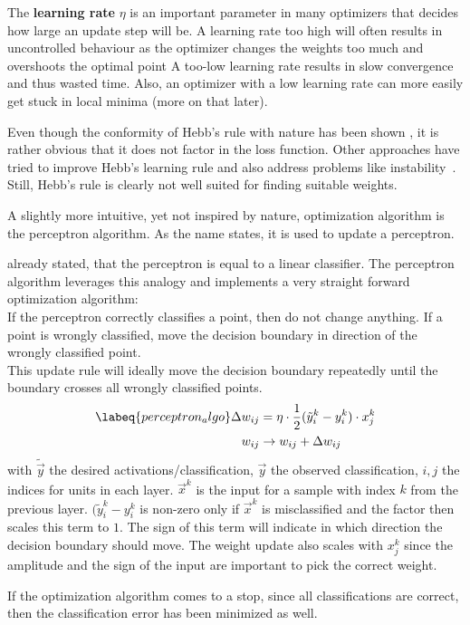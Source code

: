 The \textbf{learning rate} $\eta$ is an important parameter in many optimizers that decides how large an update step will be.
A learning rate too high will often results in uncontrolled behaviour as the optimizer changes the weights too much and overshoots the optimal point
A too-low learning rate results in slow convergence and thus wasted time.
Also, an optimizer with a low learning rate can more easily get stuck in local minima (more on that later).

Even though the conformity of Hebb's rule with nature has been shown \cite{Lomo}, it is rather obvious that it does not factor in the loss function.
Other approaches have tried to improve Hebb's learning rule and also address problems like instability~\cite{ojas_rule}.
Still, Hebb's rule is clearly not well suited for finding suitable weights.

A slightly more intuitive, yet not inspired by nature, optimization algorithm is the perceptron algorithm.
As the name states, it is used to update a perceptron.

 already stated, that the perceptron is equal to a linear classifier.
The perceptron algorithm leverages this analogy and implements a very straight forward optimization algorithm: \\
If the perceptron correctly classifies a point, then do not change anything. 
If a point is wrongly classified, move the decision boundary in direction of the wrongly classified point.\\
This update rule will ideally move the decision boundary repeatedly until the boundary crosses all wrongly classified points.
\begin{align}
    \labeq{perceptron_algo}
    \Delta w_{ij} & = \eta \cdot \frac{1}{2}(\tilde{y}^k_i - y^k_i) \cdot x^k_j \\
    w_{ij} & \rightarrow w_{ij} + \Delta w_{ij}
\end{align}
with $\tilde{\vec{y}}$ the desired activations/classification, $\vec{y}$ the observed classification, $i,j$ the indices for units in each layer.
$\vec{x}^k$ is the input for a sample with index $k$ from the previous layer.
$(\tilde{y}^k_i - y^k_i$ is non-zero only if $\vec{x}^k$ is misclassified and the factor then scales this term to $1$.
The sign of this term will indicate in which direction the decision boundary should move.
The weight update also scales with $x^k_j$ since the amplitude and the sign of the input are important to pick the correct weight.

If the optimization algorithm comes to a stop, since all classifications are correct, then the classification error has been minimized as well.

